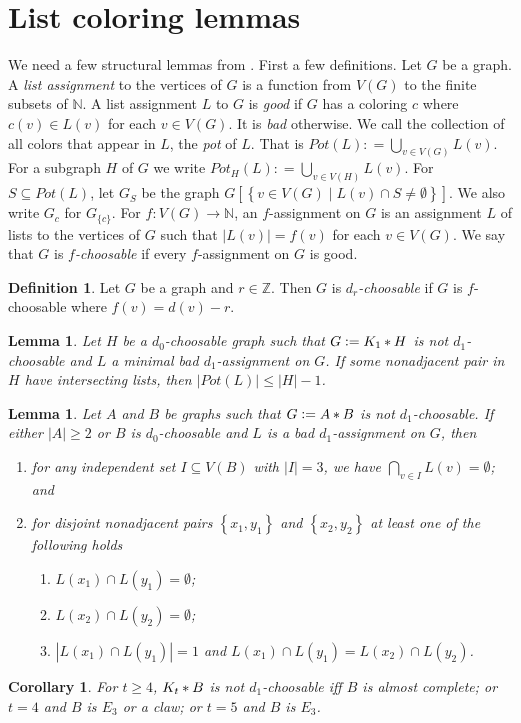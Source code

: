 \documentclass[12pt]{article}
\theoremstyle{plain}
\newtheorem{lem}[thm]{Lemma}
\newtheorem{cor}[thm]{Corollary}
\theoremstyle{definition}
\newtheorem{defn}{Definition}
\theoremstyle{remark}
\newcommand{\IN}{\mathbb{N}}
\newcommand{\set}[1]{\left\{ #1 \right\}}
\newcommand{\setb}[3]{\left\{ #1 \in #2 \mid #3 \right\}}
\newcommand{\card}[1]{\left|#1\right|}
\newcommand{\func}[3]{#1\colon #2 \rightarrow #3}
\newcommand{\join}[2]{#1 \mbox{\hspace{2 pt}$\ast$\hspace{2 pt}} #2}
\newcommand{\DefinedAs}{\mathrel{\mathop:}=}
\begin{document}
\section{List coloring lemmas}
We need a few structural lemmas from \cite{mules}.  First a few definitions. Let $G$ be a graph.  A \emph{list assignment} to the vertices of $G$ is a function from $V(G)$ to the finite subsets of $\mathbb{N}$.  A list assignment $L$ to $G$ is \emph{good} if $G$ has a coloring $c$ where $c(v) \in L(v)$ for
each $v \in V(G)$.  It is \emph{bad} otherwise.  We call the collection of all
colors that appear in $L$, the \emph{pot} of $L$.  That is $Pot(L) \DefinedAs
\bigcup_{v \in V(G)} L(v)$.  For a subgraph $H$ of $G$ we write $Pot_H(L)
\DefinedAs \bigcup_{v \in V(H)} L(v)$. For $S \subseteq Pot(L)$, let $G_S$ be
the graph $G\left[\setb{v}{V(G)}{L(v) \cap S \neq \emptyset}\right]$.  We also
write $G_c$ for $G_{\{c\}}$. For $\func{f}{V(G)}{\IN}$, an $f$-assignment on $G$ is an
assignment $L$ of lists to the vertices of $G$ such that $\card{L(v)} = f(v)$
for each $v \in V(G)$.  We say that $G$ is \textit{$f$-choosable} if every
$f$-assignment on $G$ is good.

\begin{defn}
Let $G$ be a graph and $r \in \mathbb{Z}$.  Then $G$ is \emph{$d_r$-choosable} if $G$ is $f$-choosable where $f(v) = d(v) - r$.
\end{defn}

\begin{lem}\label{NeighborhoodPotShrink}
Let $H$ be a $d_0$-choosable graph such that $G \DefinedAs \join{K_1}{H}$ is not
$d_1$-choosable and $L$ a minimal bad $d_1$-assignment on $G$.  If some
nonadjacent pair in $H$ have intersecting lists, then $\card{Pot(L)} \leq \card{H} - 1$.
\end{lem}
\begin{lem}\label{IntersectionsInB}
Let $A$ and $B$ be graphs such that $G \DefinedAs
\join{A}{B}$ is not $d_1$-choosable.  If either $\card{A} \geq 2$ or $B$ is
$d_0$-choosable and $L$ is a bad $d_1$-assignment on $G$, then
\begin{enumerate}
\item for any independent set $I \subseteq V(B)$ with $\card{I} = 3$, we have
$\bigcap_{v \in I} L(v) = \emptyset$; and
\item for disjoint nonadjacent pairs $\set{x_1, y_1}$ and $\set{x_2, y_2}$ at least one of the following holds
	\begin{enumerate}
	\item $L(x_1) \cap L(y_1) = \emptyset$;
	\item $L(x_2) \cap L(y_2) = \emptyset$;
	\item $\card{L(x_1) \cap L(y_1)} = 1$ and $L(x_1) \cap L(y_1) = L(x_2) \cap L(y_2)$.
	\end{enumerate}
\end{enumerate}
\end{lem}
\begin{cor}\label{K_tClassification}
For $t \geq 4$, $\join{K_t}{B}$ is not $d_1$-choosable iff $B$ is almost complete; or $t = 4$ and $B$ is $E_3$ or a claw; or $t = 5$ and $B$ is $E_3$.
\end{cor}



\end{document}
